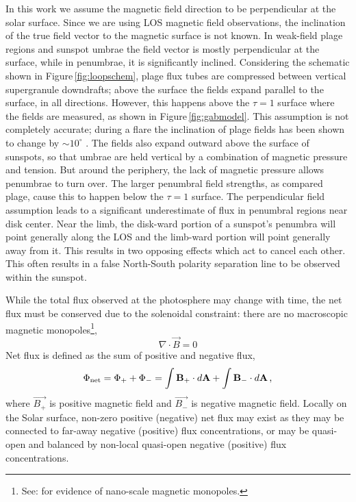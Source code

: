 In this work we  assume the magnetic field direction to be perpendicular at the solar surface. Since we are using \gls{LOS} magnetic field observations, the inclination of the true field vector to the magnetic surface is not known. In weak-field plage regions and sunspot umbrae the field vector is mostly perpendicular at the surface, while in penumbrae, it is significantly inclined. Considering the schematic shown in Figure\,\ref{fig:loopschem}, plage flux tubes are compressed between vertical supergranule downdrafts; above the surface the fields expand parallel to the surface, in all directions. However, this happens above the $\tau=1$ surface where the fields are measured, as shown in Figure\,\ref{fig:gabmodel}. This assumption is not completely accurate; during a flare the inclination of plage fields has been shown to change by $\sim$$10^{\circ}$ \citep{Murray:2012}. The fields also expand outward above the surface of sunspots, so that umbrae are held vertical by a combination of magnetic pressure and tension. But around the periphery, the lack of magnetic pressure allows penumbrae to turn over. The larger penumbral field strengths, as compared plage, cause this to happen below the $\tau=1$ surface. The perpendicular field assumption leads to a significant underestimate of flux in penumbral regions near disk center. Near the limb,  the disk-ward portion of a sunspot's penumbra will point generally along the LOS and the limb-ward portion will point generally away from it. This results in two opposing effects which act to cancel each other. This often results in a false North-South polarity separation line to be observed within the sunspot.

While the total flux observed at the photosphere may change with time, the net flux must be conserved due to the solenoidal constraint: there are no macroscopic magnetic monopoles\footnote{See: \citet{Mengotti:2010} for evidence of nano-scale magnetic monopoles.},
\begin{equation}\label{eqn_gauss_law}
\nabla\cdot\vec{B}=0  
\end{equation}
Net flux is defined as the sum of positive and negative flux,
\begin{equation}
\Phi_{\mathrm{net}}=\Phi_{+}+\Phi_{-}=\int{\vec{B_{+}}\cdot d\vec{A}} + \int{\vec{B_{-}}\cdot d\vec{A}} \mbox{\,,}
\end{equation}
where $\vec{B_{+}}$ is positive magnetic field and $\vec{B_{-}}$ is negative magnetic field. Locally on the Solar surface, non-zero positive (negative) net flux may exist as they may be connected to far-away negative (positive) flux concentrations, or may be quasi-open and balanced by non-local quasi-open negative (positive) flux concentrations.

